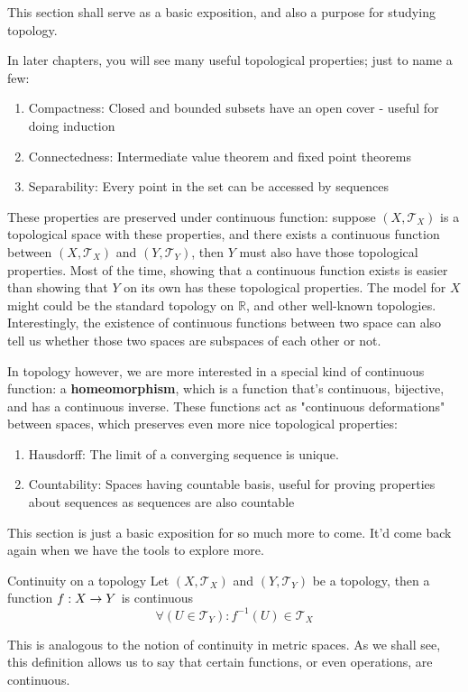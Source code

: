 This section shall serve as a basic exposition, and also a purpose for studying topology.

In later chapters, you will see many useful topological properties; just to name a few:
\begin{enumerate}
  \item Compactness: Closed and bounded subsets have an open cover - useful for doing induction
  \item Connectedness: Intermediate value theorem and fixed point theorems
  \item Separability: Every point in the set can be accessed by sequences
\end{enumerate}
These properties are preserved under continuous function: suppose \((X, \mathcal{T}_X)\)
is a topological space with these properties, and there exists a continuous function
between \((X, \mathcal{T}_X)\) and \((Y, \mathcal{T}_Y)\), then \(Y\) must also have
those topological properties. Most of the time, showing that a continuous function
exists is easier than showing that \(Y\) on its own has these topological properties.
The model for \(X\) might could be the standard topology on \(\mathbb{R}\), and other
well-known topologies. Interestingly, the existence of continuous functions between
two space can also tell us whether those two spaces are subspaces of each other or not.

In topology however, we are more interested in a special kind of continuous function:
a \textbf{homeomorphism}, which is a function that's continuous, bijective, and has a
continuous inverse. These functions act as "continuous deformations" between spaces,
which preserves even more nice topological properties:
\begin{enumerate}
  \item Hausdorff: The limit of a converging sequence is unique.
  \item Countability: Spaces having countable basis, useful for proving properties
        about sequences as sequences are also countable
\end{enumerate}

This section is just a basic exposition for so much more to come. It'd come back again
when we have the tools to explore more.
\begin{df}{Continuity on a topology}{}
  Let \((X, \mathcal{T}_X)\) and \((Y, \mathcal{T}_Y)\) be a topology, then a
  function \(f : X \rightarrow Y\) is continuous \ifft {}
  \begin{equation}
    \forall (U \in \mathcal{T}_Y) : f^{-1} (U) \in \mathcal{T}_X
  \end{equation}
\end{df}
This is analogous to the notion of continuity in metric spaces. As we shall see, this
definition allows us to say that certain functions, or even operations, are continuous.

